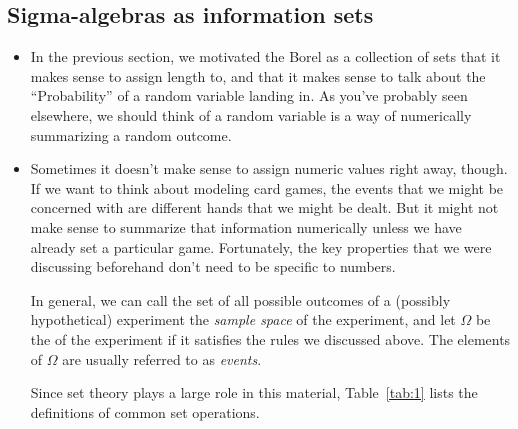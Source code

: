 \subsection{Sigma-algebras as information sets}

\begin{itemize}[leftmargin=0pt]

\item In the previous section, we motivated the Borel \sigmaalgebra as a
  collection of sets that it makes sense to assign length to, and that
  it makes sense to talk about the ``Probability'' of a random
  variable landing in.  As you've probably seen elsewhere, we should
  think of a random variable is a way of numerically summarizing a
  random outcome.

\item Sometimes it doesn't make sense to assign numeric values right
  away, though.  If we want to think about modeling card games, the
  events that we might be concerned with are different hands that we
  might be dealt.  But it might not make sense to summarize that
  information numerically unless we have already set a particular
  game.  Fortunately, the key properties that we were discussing
  beforehand don't need to be specific to numbers.

  In general, we can call the set of all possible outcomes of a
  (possibly hypothetical) experiment the \emph{sample space} of the
  experiment, and let $\Omega$ be the \emph{\sigmaalgebra} of the experiment if
  it satisfies the rules we discussed above.  The elements of $\Omega$ are
  usually referred to as \emph{events}.

  Since set theory plays a large role in this material,
  Table~\ref{tab:1} lists the definitions of common set operations.


\end{itemize}
